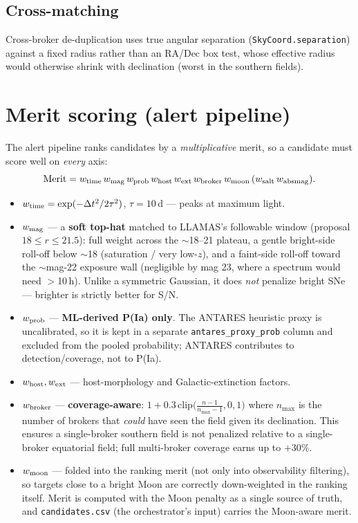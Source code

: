 \documentclass[11pt,letterpaper]{article}
\begin{document}
\subsection{Cross-matching}
Cross-broker de-duplication uses true angular separation
(\texttt{SkyCoord.separation}) against a fixed radius rather than an RA/Dec box test, whose
effective radius would otherwise shrink with declination (worst in the southern fields).

\section{Merit scoring (alert pipeline)}
The alert pipeline ranks candidates by a \emph{multiplicative} merit, so a candidate must
score well on \emph{every} axis:
\begin{equation}
\mathrm{Merit} = w_{\rm time}\, w_{\rm mag}\, w_{\rm prob}\, w_{\rm host}\,
w_{\rm ext}\, w_{\rm broker}\, w_{\rm moon}\, (w_{\rm salt}\, w_{\rm absmag}).
\end{equation}
\begin{itemize}[nosep]
  \item $w_{\rm time} = \exp(-\Delta t^2 / 2\tau^2)$, $\tau = 10$\,d --- peaks at maximum light.
  \item $w_{\rm mag}$ --- a \textbf{soft top-hat} matched to LLAMAS's followable window
  (proposal $18 \le r \le 21.5$): full weight across the $\sim$18--21 plateau, a gentle
  bright-side roll-off below $\sim$18 (saturation / very low-$z$), and a faint-side roll-off
  toward the $\sim$mag-22 exposure wall (negligible by mag 23, where a spectrum would need
  $>$10\,h). Unlike a symmetric Gaussian, it does \emph{not} penalize bright SNe --- brighter
  is strictly better for S/N.
  \item $w_{\rm prob}$ --- \textbf{ML-derived P(Ia) only}. The ANTARES heuristic proxy is
  uncalibrated, so it is kept in a separate \texttt{antares\_proxy\_prob} column and excluded
  from the pooled probability; ANTARES contributes to detection/coverage, not to P(Ia).
  \item $w_{\rm host}, w_{\rm ext}$ --- host-morphology and Galactic-extinction factors.
  \item $w_{\rm broker}$ --- \textbf{coverage-aware}:
  $1 + 0.3\,\mathrm{clip}\!\big(\tfrac{n-1}{n_{\max}-1},0,1\big)$ where $n_{\max}$ is the
  number of brokers that \emph{could} have seen the field given its declination. This ensures
  a single-broker southern field is not penalized relative to a single-broker equatorial
  field; full multi-broker coverage earns up to $+30\%$.
  \item $w_{\rm moon}$ --- folded into the ranking merit (not only into observability
  filtering), so targets close to a bright Moon are correctly down-weighted in the ranking
  itself. Merit is computed with the Moon penalty as a single source of truth, and
  \texttt{candidates.csv} (the orchestrator's input) carries the Moon-aware merit.
\end{itemize}
\end{document}
